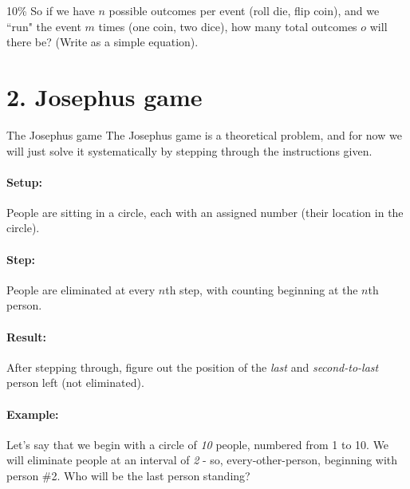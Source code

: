 \documentclass[a4paper,12pt]{book}
\begin{document}
        \begin{question}{3}{10\%}
            So if we have $n$ possible outcomes per event (roll die, flip coin),
            and we ``run" the event $m$ times (one coin, two dice),
            how many total outcomes $ o $ will there be? (Write as a simple equation).
        \end{question}

    \newpage
    \section*{2. Josephus game}

        \begin{intro}{The Josephus game}
            The Josephus game is a theoretical problem, and for now we
            will just solve it systematically by stepping through the
            instructions given.

            \paragraph{Setup:} People are sitting in a circle, each with
            an assigned number (their location in the circle).

            \paragraph{Step:} People are eliminated at every $n$th step,
            with counting beginning at the $n$th person.

            \paragraph{Result:} After stepping through, figure out the
            position of the \textit{last} and \textit{second-to-last}
            person left (not eliminated).

            \paragraph{Example:} Let's say that we begin with a circle of
            \textit{10} people, numbered from 1 to 10. We will eliminate
            people at an interval of \textit{2} - so, every-other-person,
            beginning with person \#2. Who will be the last person standing?


\end{intro}
\end{document}

